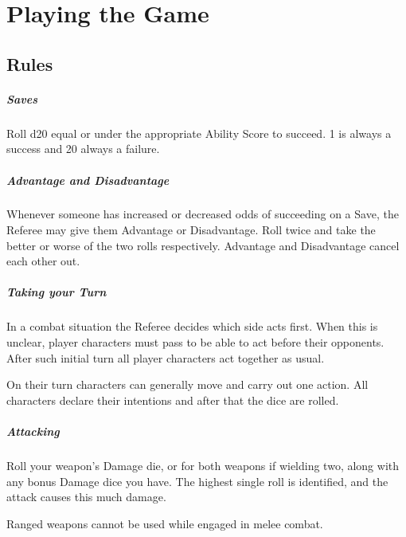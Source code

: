 \documentclass[itdr]{subfiles}
\begin{document}
\cleartoleftpage

\chapter{Playing the Game}

\section{Rules}

\paragraph{Saves}
Roll d20 equal or under the appropriate Ability Score to succeed. 1 is always a success and 20 always a failure.

\paragraph{Advantage and Disadvantage}
Whenever someone has increased or decreased odds of succeeding on a Save, the Referee may give them Advantage or Disadvantage. Roll twice and take the better or worse of the two rolls respectively. Advantage and Disadvantage cancel each other out.

\paragraph{Taking your Turn}
In a combat situation the Referee decides which side acts first. When this is unclear, player characters must pass  to be able to act before their opponents. After such initial turn all player characters act together as usual.

On their turn characters can generally move and carry out one action. All characters declare their intentions and after that the dice are rolled.

\paragraph{Attacking}
Roll your weapon's Damage die, or for both weapons if wielding two, along with any bonus Damage dice you have. The highest single roll is identified, and the attack causes this much damage.

Ranged weapons cannot be used while engaged in melee combat.
\end{document}
